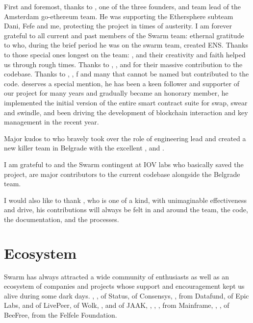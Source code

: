 First and foremost, thanks to , one of the three founders, and team lead of the Amsterdam go-ethereum team. He was supporting the Ethersphere subteam Dani, Fefe and me, protecting the project in times of austerity.
I am forever grateful to all current and past members of the Swarm team: ethernal gratitude to  who, during the brief period he was on the swarm team, created ENS. Thanks to those special ones longest on the team: ,  and  their creativity and faith helped us through rough  times. Thanks to , ,  and  for their massive contribution to the codebase. Thanks to , , f and many that cannot be named but contributed to the code.
 deserves a special mention, he has been a keen follower and supporter of our project for many years and gradually became an honorary member, he implemented the initial version of the entire smart contract suite for swap, swear and swindle, and been driving the development of blockchain interaction and key management in the recent year.

Major kudos to  who bravely took over the role of engineering lead and created a new killer team in Belgrade with the excellent ,  and . 

I am grateful to  and the Swarm contingent at IOV labs who basically saved the project,  are major contributors to the current codebase alongside the  Belgrade team. 

I would also like to thank , who is one of a kind, with unimaginable effectiveness and drive, his contributions will always be felt in and around the team, the code, the documentation, and the processes.

\section*{Ecosystem}

Swarm has always attracted a wide community of enthusiasts as well as an ecosystem of companies and projects whose support and encouragement kept us alive during some dark days. 
, ,  of Status,  of Consensys, ,  from Datafund,  of Epic Labs,  and  of LivePeer,  of Wolk, ,  and  of JAAK, , , ,  from Mainframe, , ,  of BeeFree,  from the  Felfele Foundation. 

